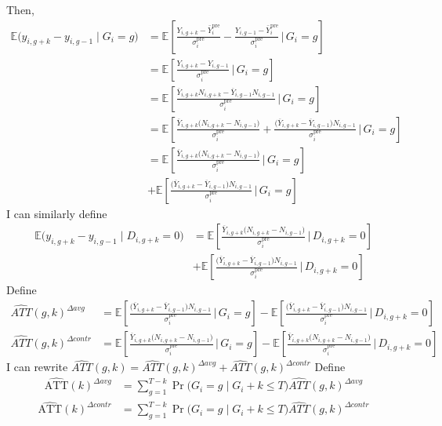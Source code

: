 \documentclass[12pt,notitlepage]{article}
\newcommand{\E}{\mathbb{E}}
\begin{document}
Then,
\begin{align*}
\E\bigl(y_{i,g+k} - y_{i,g-1}\mid G_i = g\bigr)
&= \E\!\left[\frac{Y_{i,g+k}-\bar Y_i^{\mathrm{pre}}}{\sigma_i^{\mathrm{pre}}}
 - \frac{Y_{i,g-1}-\bar Y_i^{\mathrm{pre}}}{\sigma_i^{\mathrm{pre}}}
 \,\Big|\, G_i=g\right] \\
&= \E\!\left[\frac{Y_{i,g+k}-Y_{i,g-1}}{\sigma_i^{\mathrm{pre}}}
 \,\Big|\, G_i=g\right] \\
&= \E\!\left[\frac{\overline{Y}_{i,g+k} N_{i,g+k} - \overline{Y}_{i,g-1} N_{i,g-1}}{\sigma_i^{\mathrm{pre}}}
 \,\Big|\, G_i=g\right] \\
&= \E\!\left[\frac{\overline{Y}_{i,g+k}\bigl(N_{i,g+k}-N_{i,g-1}\bigr)}{\sigma_i^{\mathrm{pre}}}
 + \frac{\bigl(\overline{Y}_{i,g+k}-\overline{Y}_{i,g-1}\bigr) N_{i,g-1}}{\sigma_i^{\mathrm{pre}}}
 \,\Big|\, G_i=g\right]\\
&= \E\!\left[\frac{\overline{Y}_{i,g+k}\bigl(N_{i,g+k}-N_{i,g-1}\bigr)}{\sigma_i^{\mathrm{pre}}}
 \,\Big|\, G_i=g\right]\\
 &+\E\!\left[\frac{\bigl(\overline{Y}_{i,g+k}-\overline{Y}_{i,g-1}\bigr) N_{i,g-1}}{\sigma_i^{\mathrm{pre}}}
 \,\Big|\, G_i=g\right]
\end{align*}
I can similarly define 
\begin{align*}
\E\bigl(y_{i,g+k} - y_{i,g-1}\mid D_{i,g+k} = 0\bigr) &= \E\!\left[\frac{\overline{Y}_{i,g+k}\bigl(N_{i,g+k}-N_{i,g-1}\bigr)}{\sigma_i^{\mathrm{pre}}}
 \,\Big|\,D_{i,g+k} = 0\right]
 \\
 &+ \E\!\left[\frac{\bigl(\overline{Y}_{i,g+k}-\overline{Y}_{i,g-1}\bigr) N_{i,g-1}}{\sigma_i^{\mathrm{pre}}}
 \,\Big|\,D_{i,g+k} = 0\right]
\end{align*}
Define
\begin{align*}
\widehat{ATT}(g,k)^{\Delta avg} &= \E\!\left[\frac{\bigl(\overline{Y}_{i,g+k}-\overline{Y}_{i,g-1}\bigr) N_{i,g-1}}{\sigma_i^{\mathrm{pre}}}
 \,\Big|\, G_i=g\right] - \E\!\left[\frac{\bigl(\overline{Y}_{i,g+k}-\overline{Y}_{i,g-1}\bigr) N_{i,g-1}}{\sigma_i^{\mathrm{pre}}}
 \,\Big|\,D_{i,g+k} = 0\right]\\
\widehat{ATT}(g,k)^{\Delta contr} &= \E\!\left[\frac{\overline{Y}_{i,g+k}\bigl(N_{i,g+k}-N_{i,g-1}\bigr)}{\sigma_i^{\mathrm{pre}}}
 \,\Big|\, G_i=g\right] - \E\!\left[\frac{\overline{Y}_{i,g+k}\bigl(N_{i,g+k}-N_{i,g-1}\bigr)}{\sigma_i^{\mathrm{pre}}}
 \,\Big|\,D_{i,g+k} = 0\right]
\end{align*}
I can rewrite $\widehat{ATT}(g,k) = \widehat{ATT}(g,k)^{\Delta avg} + \widehat{ATT}(g,k)^{\Delta contr}$ 
Define
\begin{align}
    \widehat{\mathrm{ATT}}(k)^{\Delta avg} &= \sum_{g=1}^{T-k} \Pr\bigl(G_i = g \mid G_i + k \le T\bigr) \widehat{ATT}(g,k)^{\Delta avg} \label{eq:att_delta_avg}
\end{align}
\begin{align*}
\widehat{\mathrm{ATT}}(k)^{\Delta contr} &= \sum_{g=1}^{T-k} \Pr\bigl(G_i = g \mid G_i + k \le T\bigr) \widehat{ATT}(g,k)^{\Delta contr} 
\end{align*}
\end{document}
